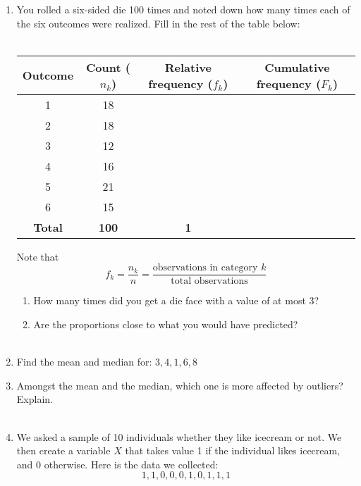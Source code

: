 \documentclass{./../../Latex/handout}
\begin{document}
\thispagestyle{plain}
\begin{center}
\end{center}	

\begin{enumerate}
\item You rolled a six-sided die 100 times and noted down how many times each of the six outcomes were realized. Fill in the rest of the table below: \\~\\
\begin{tabular}{c|c|c|c}
Outcome & Count ($n_k$) & Relative frequency ($f_k$) & Cumulative frequency ($F_k$) \\
\hline
1 &  18 & & \\
\hline
2 & 18 & & \\
\hline
3 & 12 & & \\
\hline
4 & 16 & & \\
\hline
5 & 21 & & \\
\hline
6 & 15 & & \\
\hline
\textbf{Total} & \textbf{100} & \textbf{1} & \\
\hline
\end{tabular}
\vspace{0.5em}

Note that $$ f_k = \frac{n_k}{n} = \frac{\text{observations in category $k$}}{\text{total observations}} $$

\begin{enumerate}
	\item How many times did you get a die face with a value of at most 3? \\ 
	\item Are the proportions close to what you would have predicted? \\~\\
\end{enumerate}

\item Find the mean and median for: $ 3, 4, 1, 6, 8 $
\vspace{5em}
\item Amongst the mean and the median, which one is more affected by outliers? Explain. \\~\\
\item We asked a sample of 10 individuals whether they like icecream or not. We then create a variable $X$ that takes value 1 if the individual likes icecream, and 0 otherwise.  Here is the data we collected:
$$ 1, 1, 0, 0, 0, 1, 0, 1, 1, 1 $$


\end{enumerate}
\end{document}

